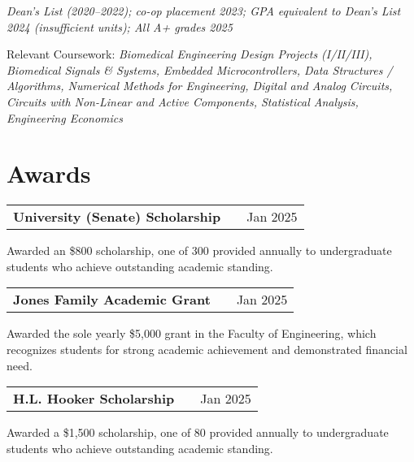 \documentclass[a4paper,10pt]{article}
\begin{document}
\textit{Dean’s List (2020–2022); co-op placement 2023; GPA equivalent to Dean’s List 2024 (insufficient units); All A+ grades 2025}

Relevant Coursework: \textit{Biomedical Engineering Design Projects (I/II/III), Biomedical Signals \& Systems,
Embedded Microcontrollers, Data Structures / Algorithms, Numerical Methods for Engineering, Digital and Analog Circuits, Circuits with Non-Linear and Active Components, Statistical Analysis, Engineering Economics}


\section{Awards}
\begin{tabularx}{\linewidth}{@{}l X r@{}}
\textbf{University (Senate) Scholarship} & \hfill &     Jan 2025
 \\[3.75pt]
\end{tabularx}
Awarded an \$800\textbf{ }scholarship, one of 300 provided annually to undergraduate students who achieve outstanding academic standing.


\vspace{6pt}

\begin{tabularx}{\linewidth}{@{}l X r@{}}
\textbf{Jones Family Academic Grant} & \hfill &     Jan 2025
 \\[3.75pt]
\end{tabularx}
Awarded the sole yearly \$5,000 grant in the Faculty of Engineering, which recognizes students for strong academic achievement and demonstrated financial need.


\vspace{6pt}

\begin{tabularx}{\linewidth}{@{}l X r@{}}
\textbf{H.L. Hooker Scholarship} & \hfill &     Jan 2025
 \\[3.75pt]
\end{tabularx}
Awarded a \$1,500 scholarship, one of 80 provided annually to undergraduate students who achieve outstanding academic standing.
\vspace{6pt}
\end{document}
